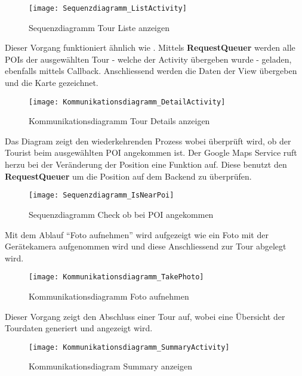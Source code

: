 \begin{figure}
  \texttt{[image: Sequenzdiagramm\_ListActivity]}
  \caption{Sequenzdiagramm Tour Liste anzeigen}
\end{figure}

Dieser Vorgang funktioniert ähnlich wie . Mittels
\textbf{RequestQueuer} werden alle POIs der ausgewählten Tour - welche der Activity übergeben
wurde - geladen, ebenfalls mittels Callback. Anschliessend werden die Daten der View
übergeben und die Karte gezeichnet.

\begin{figure}
  \texttt{[image: Kommunikationsdiagramm\_DetailActivity]}
  \caption{Kommunikationsdiagramm Tour Details anzeigen}
\end{figure}

\newpage
{}
Das Diagram zeigt den wiederkehrenden Prozess wobei überprüft wird, ob der Tourist beim
ausgewählten POI angekommen ist. Der Google Maps Service ruft herzu bei der Veränderung
der Position eine Funktion auf. Diese benutzt den \textbf{RequestQueuer} um die Position
auf dem Backend zu überprüfen.

\begin{figure}
  \texttt{[image: Sequenzdiagramm\_IsNearPoi]}
  \caption{Sequenzdiagramm Check ob bei POI angekommen}
\end{figure}

\newpage
{}
Mit dem Ablauf ``Foto aufnehmen'' wird aufgezeigt wie ein Foto mit der Gerätekamera
aufgenommen wird und diese Anschliessend zur Tour abgelegt wird.

\begin{figure}
  \texttt{[image: Kommunikationsdiagramm\_TakePhoto]}
  \caption{Kommunikationsdiagramm Foto aufnehmen}
\end{figure}

Dieser Vorgang zeigt den Abschluss einer Tour auf, wobei eine Übersicht der Tourdaten
generiert und angezeigt wird.
\begin{figure}
  \texttt{[image: Kommunikationsdiagramm\_SummaryActivity]}
  \caption{Kommunikationsdiagram Summary anzeigen}
\end{figure}
